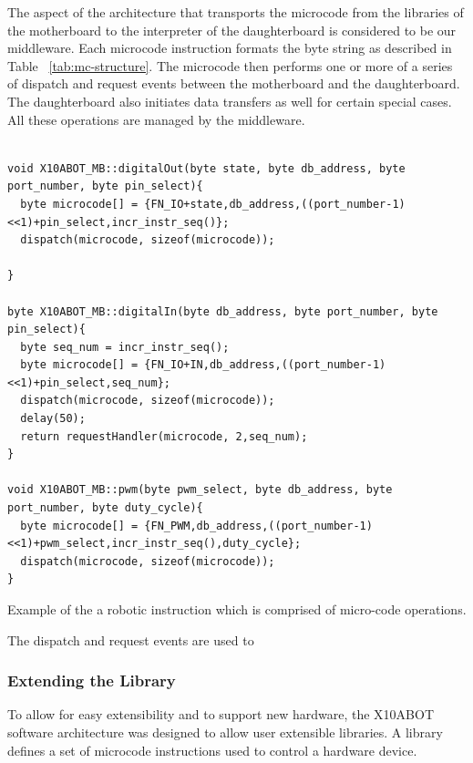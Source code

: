 	The aspect of the \xten architecture that transports the microcode from the libraries of the motherboard to the interpreter of the daughterboard is considered to be our middleware. Each microcode instruction formats the byte string as described in Table ~\ref{tab:mc-structure}. The microcode then performs one or more of a series of dispatch and request events between the motherboard and the daughterboard. The daughterboard also initiates data transfers as well for certain special cases. All these operations are managed by the middleware. 
\begin{listing}
\footnotesize
\label{code:instr}
{\fontsize{8}{6}\selectfont
\begin{verbatim}

void X10ABOT_MB::digitalOut(byte state, byte db_address, byte port_number, byte pin_select){
  byte microcode[] = {FN_IO+state,db_address,((port_number-1)<<1)+pin_select,incr_instr_seq()};
  dispatch(microcode, sizeof(microcode));

}

byte X10ABOT_MB::digitalIn(byte db_address, byte port_number, byte pin_select){
  byte seq_num = incr_instr_seq();
  byte microcode[] = {FN_IO+IN,db_address,((port_number-1)<<1)+pin_select,seq_num};
  dispatch(microcode, sizeof(microcode));
  delay(50);
  return requestHandler(microcode, 2,seq_num);
}

void X10ABOT_MB::pwm(byte pwm_select, byte db_address, byte port_number, byte duty_cycle){
  byte microcode[] = {FN_PWM,db_address,((port_number-1)<<1)+pwm_select,incr_instr_seq(),duty_cycle};
  dispatch(microcode, sizeof(microcode));
}

\end{verbatim}
}
\caption{Example of the a robotic instruction which is comprised of micro-code operations.} 
\end{listing}	

The dispatch and request events are used to
	
	\subsubsection{Extending the Library} %
	\label{ssub:extending_the_library}
	
	To allow for easy extensibility and to support new hardware, the X10ABOT software architecture was designed to allow user extensible libraries. A library defines a set of microcode instructions used to control a hardware device.
	
